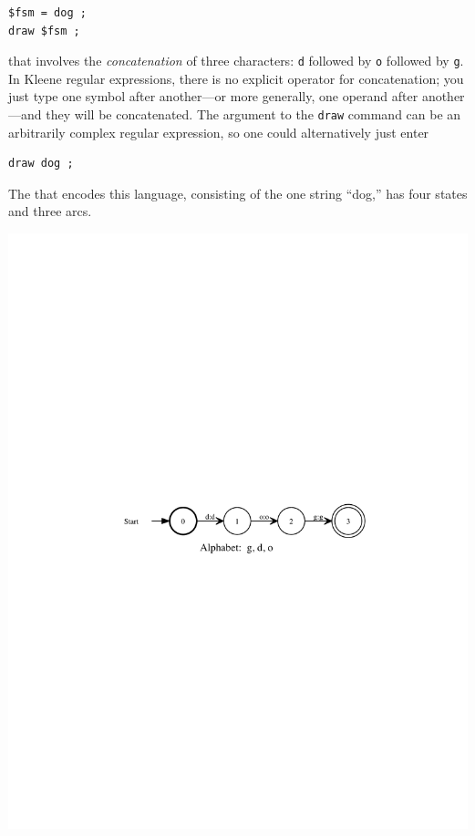 \begin{Verbatim}
$fsm = dog ;
draw $fsm ;
\end{Verbatim}

\noindent
that involves the \emph{concatenation} of three characters: \texttt{d} followed by
\texttt{o} followed by \texttt{g}.   In Kleene regular expressions, there is no
explicit operator for concatenation; you just type one symbol after another---or
more generally, one operand after another---and they will be concatenated.  
The argument to the \texttt{draw} command can be
an arbitrarily complex regular expression, so one could alternatively just enter

\begin{Verbatim}
draw dog ;
\end{Verbatim}

The \fsm{} that encodes this language, consisting
of the one string ``dog,'' has four states and three arcs.

\begin{center}
\includegraphics{images/dog.pdf}
\end{center}

